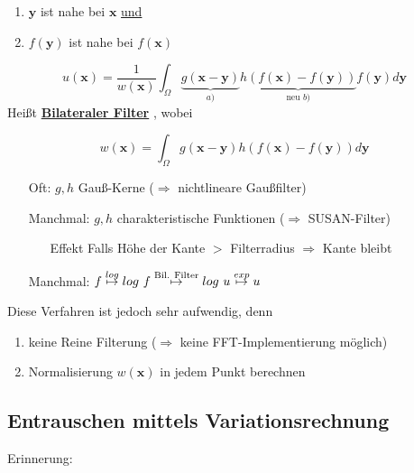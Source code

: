 \documentclass{article}
\theoremstyle{plain}
\theoremstyle{definition}
\numberwithin{equation}{section}
\newcommand{\mim}[1] {
\underline{\textbf{#1\index{#1}}}
}
\newcommand{\x}[0] {
  \boldsymbol{x}
}
\newcommand{\y}[0] {
    \boldsymbol{y}
}
\begin{document}
      \begin{enumerate}[label= \alph*)]
          \item $\y$ ist nahe bei $\x$ \underline{und}
          \item $f(\y)$ ist nahe bei $f(\x)$
      \end{enumerate}

      \[u(\x) = \frac{1}{w(\x)} \int_\Omega \underbrace{g(\x - \y)}_{a)} \underbrace{h(f(\x) - f(\y))}_{\text{neu }b)} f(\y) d\y\]
      Heißt \mim{Bilateraler Filter}, wobei

      \[w(\x) = \int_\Omega g(\x - \y) h(f(\x) - f(\y)) d\y\]

      \begin{enumerate}
          \item[Oft:] $g,h$ Gauß-Kerne ($\Rightarrow$ nichtlineare Gaußfilter)
          \item[Manchmal:] $g,h$ charakteristische Funktionen ($\Rightarrow$ SUSAN-Filter)
          \begin{enumerate}
              \item[Effekt] Falls Höhe der Kante $>$ Filterradius $\Rightarrow$ Kante bleibt
          \end{enumerate}
          \item[Manchmal:] $f \overset{log}{\mapsto} log \ f \overset{\small \text{Bil. Filter}}{\mapsto} log \ u \overset{exp}{\mapsto} u$
      \end{enumerate}
      Diese Verfahren ist jedoch sehr aufwendig, denn
      \begin{enumerate}[label=\textbullet]
          \item keine Reine Filterung ($\Rightarrow$ keine FFT-Implementierung möglich)
          \item Normalisierung $w(\x)$ in jedem Punkt berechnen
      \end{enumerate}

      \subsection{Entrauschen mittels Variationsrechnung}
      Erinnerung:
      \begin{center}
      \end{center}
\end{document}
